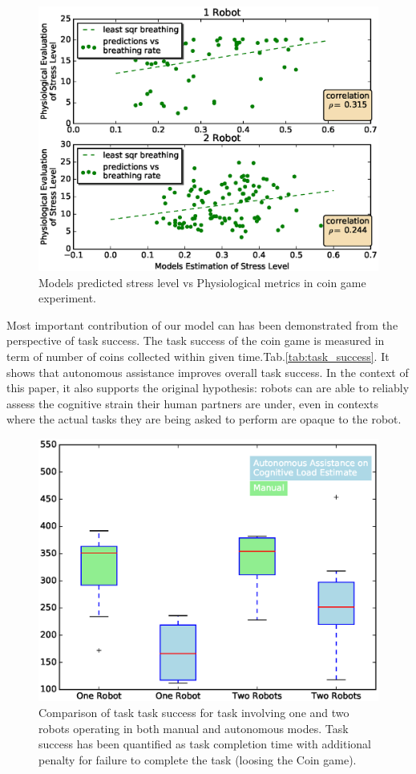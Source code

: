 \documentclass{sig-alternate}
\begin{document}
\begin{figure}  
\centering
\includegraphics[width=.5\textwidth]{prediction_vs_b_p_2.eps}
\caption{Models predicted stress level vs Physiological metrics in coin game experiment.}
\label{fig:pred_phy}
\end{figure}

Most important contribution of our model can has been demonstrated from the perspective of task success. The task
success of the coin game is measured in term of number of coins collected within given time.Tab.\ref{tab:task_success}.
It shows that autonomous assistance improves overall task success. In the context of this paper, it also supports the
original hypothesis: robots can are able to reliably assess the cognitive strain their human partners are under, even in
contexts where the actual tasks they are being asked to perform are opaque to the robot.

\begin{figure}
\centering
\includegraphics[width=.5\textwidth]{BoxWiskerTimesCompMaualVsAuto2.eps}
\caption{Comparison of task task success for task involving one and two robots operating in both manual and autonomous modes. Task success has been quantified as task completion time with additional penalty for failure to complete the task (loosing the Coin game).}
\label{fig:BoxWiskersTimeComp}
\end{figure}
\end{document}
